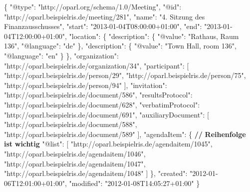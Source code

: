 \documentclass[,a4paper]{article}
\newenvironment{Shaded}{}{}
\newcommand{\DataTypeTok}[1]{\textcolor[rgb]{0.56,0.13,0.00}{{#1}}}
\newcommand{\StringTok}[1]{\textcolor[rgb]{0.25,0.44,0.63}{{#1}}}
\newcommand{\ErrorTok}[1]{\textcolor[rgb]{1.00,0.00,0.00}{\textbf{{#1}}}}
\newcommand{\NormalTok}[1]{{#1}}
\begin{document}
\begin{Shaded}
\begin{Highlighting}[]
\NormalTok{\{}
    \DataTypeTok{"@type"}\NormalTok{: }\StringTok{"http://oparl.org/schema/1.0/Meeting"}\NormalTok{,}
    \DataTypeTok{"@id"}\NormalTok{: }\StringTok{"http://oparl.beispielris.de/meeting/281"}\NormalTok{,}
    \DataTypeTok{"name"}\NormalTok{: }\StringTok{"4. Sitzung des Finanzausschusses"}\NormalTok{,}
    \DataTypeTok{"start"}\NormalTok{: }\StringTok{"2013-01-04T08:00:00+01:00"}\NormalTok{,}
    \DataTypeTok{"end"}\NormalTok{: }\StringTok{"2013-01-04T12:00:00+01:00"}\NormalTok{,}
    \DataTypeTok{"location"}\NormalTok{: \{}
        \DataTypeTok{"description"}\NormalTok{: \{}
            \DataTypeTok{"@value"}\NormalTok{: }\StringTok{"Rathaus, Raum 136"}\NormalTok{,}
            \DataTypeTok{"@language"}\NormalTok{: }\StringTok{"de"}
        \NormalTok{\},}
        \DataTypeTok{"description"}\NormalTok{: \{}
            \DataTypeTok{"@value"}\NormalTok{: }\StringTok{"Town Hall, room 136"}\NormalTok{,}
            \DataTypeTok{"@language"}\NormalTok{: }\StringTok{"en"}
        \NormalTok{\}}
    \NormalTok{\},}
    \DataTypeTok{"organization"}\NormalTok{: }\StringTok{"http://oparl.beispielris.de/organization/34"}\NormalTok{,}
    \DataTypeTok{"participant"}\NormalTok{: [}
        \StringTok{"http://oparl.beispielris.de/person/29"}\NormalTok{,}
        \StringTok{"http://oparl.beispielris.de/person/75"}\NormalTok{,}
        \StringTok{"http://oparl.beispielris.de/person/94"}
    \NormalTok{],}
    \DataTypeTok{"invitation"}\NormalTok{: }\StringTok{"http://oparl.beispielris.de/document/586"}\NormalTok{,}
    \DataTypeTok{"resultsProtocol"}\NormalTok{: }\StringTok{"http://oparl.beispielris.de/document/628"}\NormalTok{,}
    \DataTypeTok{"verbatimProtocol"}\NormalTok{: }\StringTok{"http://oparl.beispielris.de/document/691"}\NormalTok{,}
    \DataTypeTok{"auxiliaryDocument"}\NormalTok{: [}
        \StringTok{"http://oparl.beispielris.de/document/588"}\NormalTok{,}
        \StringTok{"http://oparl.beispielris.de/document/589"}
    \NormalTok{],}
    \DataTypeTok{"agendaItem"}\NormalTok{: \{}
    \ErrorTok{//} \ErrorTok{Reihenfolge} \ErrorTok{ist} \ErrorTok{wichtig}
        \DataTypeTok{"@list"}\NormalTok{: [}
            \StringTok{"http://oparl.beispielris.de/agendaitem/1045"}\NormalTok{,}
            \StringTok{"http://oparl.beispielris.de/agendaitem/1046"}\NormalTok{,}
            \StringTok{"http://oparl.beispielris.de/agendaitem/1047"}\NormalTok{,}
            \StringTok{"http://oparl.beispielris.de/agendaitem/1048"}
        \NormalTok{]}
    \NormalTok{\},}
    \DataTypeTok{"created"}\NormalTok{: }\StringTok{"2012-01-06T12:01:00+01:00"}\NormalTok{,}
    \DataTypeTok{"modified"}\NormalTok{: }\StringTok{"2012-01-08T14:05:27+01:00"}
\NormalTok{\}}
\end{Highlighting}
\end{Shaded}
\end{document}
